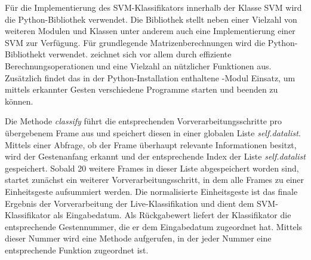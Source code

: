 Für die Implementierung des \ac{SVM}-Klassifikators innerhalb der Klasse SVM wird die Python-Bibliothek \cite{scikit-learn} verwendet. 
Die Bibliothek stellt neben einer Vielzahl von weiteren Modulen und Klassen unter anderem auch eine Implementierung einer SVM zur Verfügung.
Für grundlegende Matrizenberechnungen wird die Python-Bibliothekt \cite{NumPy} verwendet. \cite{NumPy} zeichnet sich vor allem durch effiziente Berechnungsoperationen und eine Vielzahl an nützlicher Funktionen aus.
Zusätzlich findet das in der Python-Installation enthaltene \cite{subprocess}-Modul Einsatz, um mittels erkannter Gesten verschiedene Programme starten und beenden zu können.

Die Methode \textit{classify} führt die entsprechenden Vorverarbeitungsschritte pro übergebenem Frame aus und speichert diesen in einer globalen Liste \textit{self.datalist}. 
Mittels einer Abfrage, ob der Frame überhaupt relevante Informationen besitzt, wird der Gestenanfang erkannt und der entsprechende Index der Liste \textit{self.datalist} gespeichert.
Sobald 20 weitere Frames in dieser Liste abgespeichert worden sind, startet zunächst ein weiterer Vorverarbeitungsschritt, in dem alle Frames zu einer Einheitsgeste aufsummiert werden.
Die normalisierte Einheitsgeste ist das finale Ergebnis der Vorverarbeitung der Live-Klassifikation und dient dem SVM-Klassifikator als Eingabedatum.
Als Rückgabewert liefert der Klassifikator die entsprechende Gestennummer, die er dem Eingabedatum zugeordnet hat.
Mittels dieser Nummer wird eine Methode aufgerufen, in der jeder Nummer eine entsprechende Funktion zugeordnet ist.

